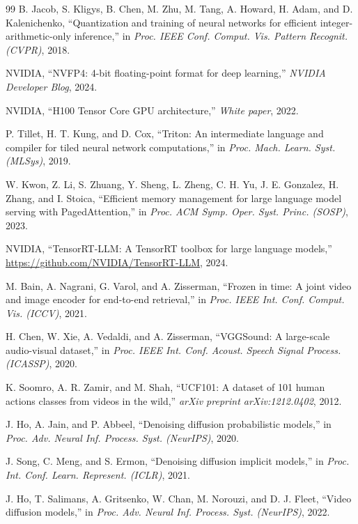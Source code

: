 \documentclass[journal,twoside]{IEEEtran}
\theoremstyle{definition}
\theoremstyle{remark}
\begin{document}
\begin{thebibliography}{99}
B. Jacob, S. Kligys, B. Chen, M. Zhu, M. Tang, A. Howard, H. Adam, and D. Kalenichenko, ``Quantization and training of neural networks for efficient integer-arithmetic-only inference,'' in \textit{Proc. IEEE Conf. Comput. Vis. Pattern Recognit. (CVPR)}, 2018.

NVIDIA, ``{NVFP4}: 4-bit floating-point format for deep learning,'' \textit{NVIDIA Developer Blog}, 2024.

NVIDIA, ``{H100} Tensor Core GPU architecture,'' \textit{White paper}, 2022.

P. Tillet, H. T. Kung, and D. Cox, ``Triton: An intermediate language and compiler for tiled neural network computations,'' in \textit{Proc. Mach. Learn. Syst. (MLSys)}, 2019.

W. Kwon, Z. Li, S. Zhuang, Y. Sheng, L. Zheng, C. H. Yu, J. E. Gonzalez, H. Zhang, and I. Stoica, ``Efficient memory management for large language model serving with {PagedAttention},'' in \textit{Proc. ACM Symp. Oper. Syst. Princ. (SOSP)}, 2023.

NVIDIA, ``{TensorRT-LLM}: A TensorRT toolbox for large language models,'' \url{https://github.com/NVIDIA/TensorRT-LLM}, 2024.

M. Bain, A. Nagrani, G. Varol, and A. Zisserman, ``Frozen in time: A joint video and image encoder for end-to-end retrieval,'' in \textit{Proc. IEEE Int. Conf. Comput. Vis. (ICCV)}, 2021.

H. Chen, W. Xie, A. Vedaldi, and A. Zisserman, ``{VGGSound}: A large-scale audio-visual dataset,'' in \textit{Proc. IEEE Int. Conf. Acoust. Speech Signal Process. (ICASSP)}, 2020.

K. Soomro, A. R. Zamir, and M. Shah, ``{UCF101}: A dataset of 101 human actions classes from videos in the wild,'' \textit{arXiv preprint arXiv:1212.0402}, 2012.

J. Ho, A. Jain, and P. Abbeel, ``Denoising diffusion probabilistic models,'' in \textit{Proc. Adv. Neural Inf. Process. Syst. (NeurIPS)}, 2020.

J. Song, C. Meng, and S. Ermon, ``Denoising diffusion implicit models,'' in \textit{Proc. Int. Conf. Learn. Represent. (ICLR)}, 2021.

J. Ho, T. Salimans, A. Gritsenko, W. Chan, M. Norouzi, and D. J. Fleet, ``Video diffusion models,'' in \textit{Proc. Adv. Neural Inf. Process. Syst. (NeurIPS)}, 2022.


\end{thebibliography}
\end{document}

